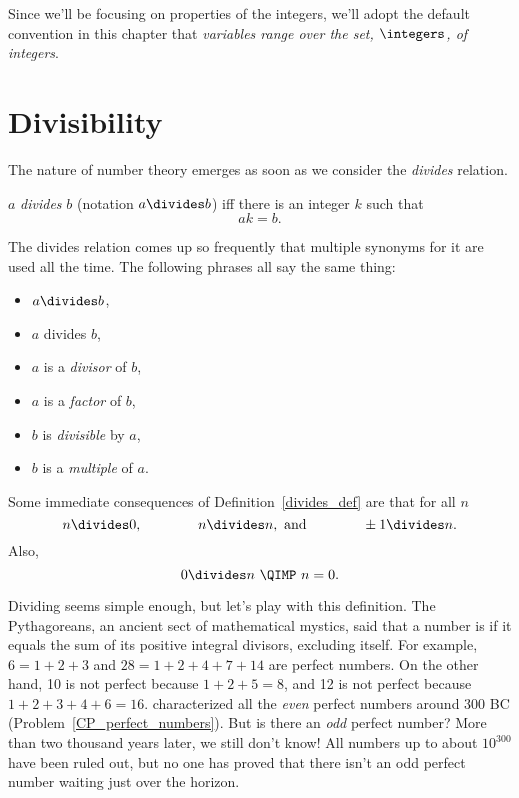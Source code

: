 
Since we'll be focusing on properties of the integers, we'll adopt the
default convention in this chapter that \emph{variables range over
  the set, $\integers$, of integers}.

\section{Divisibility}\label{divisibility_sec}

The nature of number theory emerges as soon as we consider the \emph{divides}%
relation.
\begin{definition}\label{divides_def}
$a$ \emph{divides} $b$ (notation $a \divides b$) iff there is an integer $k$ such that
\[
ak = b.
\]
\end{definition}
The divides relation comes up so frequently that multiple synonyms for it are used all the
time.  The following phrases all say the same thing:
\begin{itemize}
\item $a \divides b$,
\item $a$ divides $b$,
\item $a$ is a \emph{divisor} of $b$,
\item $a$ is a \emph{factor} of $b$,
\item $b$ is \emph{divisible} by $a$,
\item $b$ is a \emph{multiple} of $a$.
\end{itemize}
Some immediate consequences of Definition~\ref{divides_def} are that for
all $n$
\[
n  \divides 0,\qquad\qquad
n  \divides n, \text{ and}\qquad\qquad
\pm1  \divides n.
\]
Also,
\[
0 \divides n\ \QIMP\ n = 0.
\]

Dividing seems simple enough, but let's play with this definition.  The Pythagoreans, an
ancient sect of mathematical mystics, said that a number is  if it equals the sum of its positive 
integral divisors, excluding itself.  For example, $6 = 1 + 2 + 3$ 
and $28 = 1 + 2 + 4 + 7 + 14$ are perfect numbers.
On the other hand, 10 is not perfect because 
$1 + 2 + 5 = 8$, and 12 is not perfect because
$1 + 2 + 3 + 4 + 6 = 16$.   characterized all the 
\emph{even} perfect numbers
around 300 BC (Problem~\ref{CP_perfect_numbers}).  But is there an \emph{odd} perfect
number?  More than two thousand years later, we still don't know!  
All numbers up to about
$10^{300}$ have been ruled out, but no one has proved that there isn't an odd perfect
number waiting just over the horizon.

